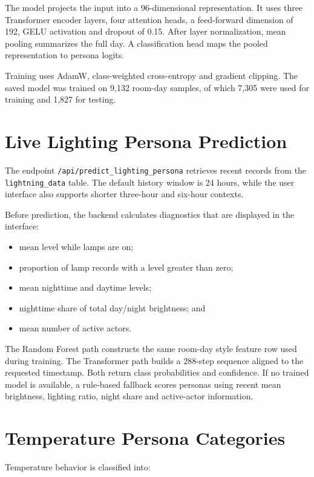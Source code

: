 The model projects the input into a 96-dimensional representation. It uses
three Transformer encoder layers, four attention heads, a feed-forward
dimension of 192, GELU activation and dropout of 0.15. After layer
normalization, mean pooling summarizes the full day. A classification head
maps the pooled representation to persona logits.

Training uses AdamW, class-weighted cross-entropy and gradient clipping. The
saved model was trained on 9,132 room-day samples, of which 7,305 were used for
training and 1,827 for testing.

\section{Live Lighting Persona Prediction}

The endpoint \texttt{/api/predict\_lighting\_persona} retrieves recent records
from the \texttt{lightning\_data} table. The default history window is 24
hours, while the user interface also supports shorter three-hour and six-hour
contexts.

Before prediction, the backend calculates diagnostics that are displayed in
the interface:

\begin{itemize}
    \item mean level while lamps are on;
    \item proportion of lamp records with a level greater than zero;
    \item mean nighttime and daytime levels;
    \item nighttime share of total day/night brightness; and
    \item mean number of active actors.
\end{itemize}

The Random Forest path constructs the same room-day style feature row used
during training. The Transformer path builds a 288-step sequence aligned to the
requested timestamp. Both return class probabilities and confidence. If no
trained model is available, a rule-based fallback scores personas using recent
mean brightness, lighting ratio, night share and active-actor information.

\section{Temperature Persona Categories}

Temperature behavior is classified into:

